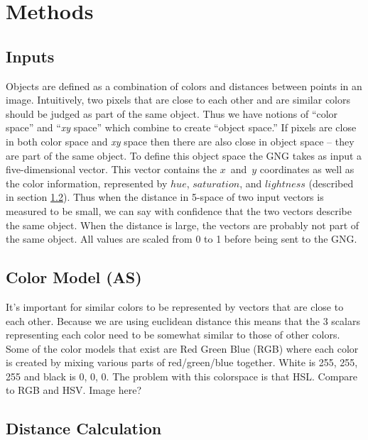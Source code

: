 \documentclass{article}
\renewcommand{\|}{\origbar} %
\newcommand{\xyspace}{{\em xy} space}
\begin{document}
\section{Methods}

\subsection{Inputs}


Objects are defined as a combination of colors and distances between points in an image. Intuitively, two pixels that are close to each other and are similar colors should be judged as part of the same object. Thus we have notions of ``color space'' and ``\xyspace'' which combine to create ``object space.'' If pixels are close in both color space and \xyspace{} then there are also close in object space -- they are part of the same object. To define this object space the GNG takes as input a five-dimensional vector. This vector contains the $x$~and~$y$ coordinates as well as the color information, represented by $hue$, $saturation$, and $lightness$ (described in section \ref{sec:colorModel}). Thus when the distance in 5-space of two input vectors is measured to be small, we can say with confidence that the two vectors describe the same object. When the distance is large, the vectors are probably not part of the same object. All values are scaled from 0 to 1 before being sent to the GNG.

\subsection{Color Model (AS)}
\label{sec:colorModel}

It's important for similar colors to be represented by vectors that are close to each other. Because we are using euclidean distance this means that the 3 scalars representing each color need to be somewhat similar to those of other colors. Some of the color models that exist are Red Green Blue (RGB) where each color is created by mixing various parts of red/green/blue together. White is 255, 255, 255 and black is 0, 0, 0. The problem with this colorspace is that 
HSL. Compare to RGB and HSV. Image here?


\subsection{Distance Calculation}
\end{document}
